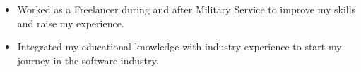 





\begin{itemize}
    \item Worked as a Freelancer during and after Military Service to improve my skills and raise my experience.
    \item Integrated my educational knowledge with industry experience to start my journey in the software industry.
\end{itemize}